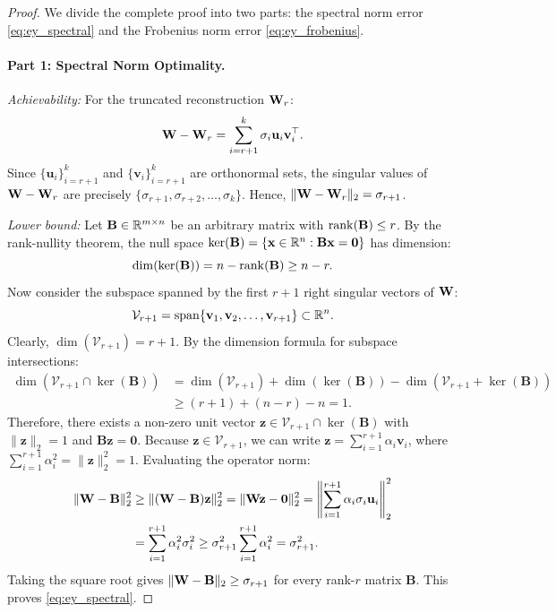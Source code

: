 \begin{proof}
We divide the complete proof into two parts: the spectral norm error \eqref{eq:ey_spectral} and the Frobenius norm error \eqref{eq:ey_frobenius}.

\paragraph{Part 1: Spectral Norm Optimality.}
\emph{Achievability:} For the truncated reconstruction $\mathbf{W}_r$:
\begin{equation}
  \mathbf{W} - \mathbf{W}_r = \sum_{i=r+1}^k \sigma_i \mathbf{u}_i \mathbf{v}_i^\top.
\end{equation}
Since $\{\mathbf{u}_i\}_{i=r+1}^k$ and $\{\mathbf{v}_i\}_{i=r+1}^k$ are orthonormal sets, the singular values of $\mathbf{W} - \mathbf{W}_r$ are precisely $\{\sigma_{r+1}, \sigma_{r+2}, \ldots, \sigma_k\}$.
Hence, $\|\mathbf{W} - \mathbf{W}_r\|_2 = \sigma_{r+1}$.

\emph{Lower bound:} Let $\mathbf{B} \in \mathbb{R}^{m \times n}$ be an arbitrary matrix with $\operatorname{rank}(\mathbf{B}) \leq r$.
By the rank-nullity theorem, the null space $\ker(\mathbf{B}) = \{\mathbf{x} \in \mathbb{R}^n : \mathbf{B}\mathbf{x} = \mathbf{0}\}$ has dimension:
\begin{equation}
  \dim(\ker(\mathbf{B})) = n - \operatorname{rank}(\mathbf{B}) \geq n - r.
\end{equation}
Now consider the subspace spanned by the first $r+1$ right singular vectors of $\mathbf{W}$:
\begin{equation}
  \mathcal{V}_{r+1} = \operatorname{span}\{\mathbf{v}_1, \mathbf{v}_2, \ldots, \mathbf{v}_{r+1}\} \subset \mathbb{R}^n.
\end{equation}
Clearly, $\dim(\mathcal{V}_{r+1}) = r+1$.
By the dimension formula for subspace intersections:
\begin{align}
  \dim(\mathcal{V}_{r+1} \cap \ker(\mathbf{B}))
  &= \dim(\mathcal{V}_{r+1}) + \dim(\ker(\mathbf{B})) - \dim(\mathcal{V}_{r+1} + \ker(\mathbf{B})) \nonumber\\
  &\geq (r+1) + (n - r) - n = 1.
\end{align}
Therefore, there exists a non-zero unit vector $\mathbf{z} \in \mathcal{V}_{r+1} \cap \ker(\mathbf{B})$ with $\|\mathbf{z}\|_2 = 1$ and $\mathbf{B}\mathbf{z} = \mathbf{0}$.
Because $\mathbf{z} \in \mathcal{V}_{r+1}$, we can write $\mathbf{z} = \sum_{i=1}^{r+1} \alpha_i \mathbf{v}_i$, where $\sum_{i=1}^{r+1} \alpha_i^2 = \|\mathbf{z}\|_2^2 = 1$.
Evaluating the operator norm:
\begin{align}
  \|\mathbf{W} - \mathbf{B}\|_2^2
  &\geq \|(\mathbf{W} - \mathbf{B})\mathbf{z}\|_2^2
  = \|\mathbf{W}\mathbf{z} - \mathbf{0}\|_2^2
  = \left\| \sum_{i=1}^{r+1} \alpha_i \sigma_i \mathbf{u}_i \right\|_2^2 \nonumber\\
  &= \sum_{i=1}^{r+1} \alpha_i^2 \sigma_i^2
  \geq \sigma_{r+1}^2 \sum_{i=1}^{r+1} \alpha_i^2 = \sigma_{r+1}^2.
\end{align}
Taking the square root gives $\|\mathbf{W} - \mathbf{B}\|_2 \geq \sigma_{r+1}$ for every rank-$r$ matrix $\mathbf{B}$.
This proves \eqref{eq:ey_spectral}.


\end{proof}
